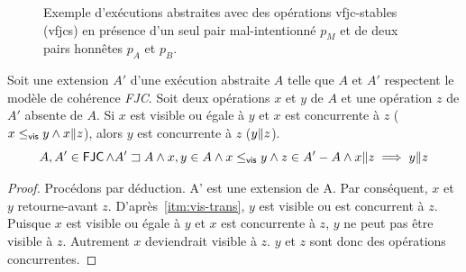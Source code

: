 \begin{figure}[htb]
\begin{subfigure}{\linewidth}
\caption{}\label{fig:vfjcs-one-malicious-3}
\end{subfigure}
\caption[Stabilité \acl{VFJC} en présence d'un pair mal-intentionné]{Exemple d'exécutions abstraites avec des opérations vfjc-stables (vfjcs) en présence d'un seul pair mal-intentionné $p_M$ et de deux pairs honnêtes $p_A$ et $p_B$.}\label{fig:vfjcs-one-malicious}
\end{figure}

\begin{proposition}\label{th:concur-triad}
Soit une extension $A'$ d'une exécution abstraite $A$ telle que $A$ et $A'$ respectent le modèle de cohérence \emph{FJC}.
Soit deux opérations $x$ et $y$ de $A$ et une opération $z$ de $A'$ absente de $A$.
Si $x$ est visible ou égale à $y$ et $x$ est concurrente à $z$ ($x \leq_{\operatorname{\mathsf{vis}}} y \land x \| z$), alors $y$ est concurrente à $z$ ($y \| z$).
\begin{equation*}
    A, A' \in \operatorname{\mathsf{FJC}} \land A' \sqsupset A \land x, y \in A \land x \leq_{\operatorname{\mathsf{vis}}} y \land z \in A'- A \land x \| z \implies y \| z
\end{equation*}
\end{proposition}

\begin{proof}
Procédons par déduction.
A' est une extension de A.
Par conséquent, $x$ et $y$ retourne-avant $z$.
D'après~\ref{itm:vis-trans}, $y$ est visible ou est concurrent à $z$.
Puisque $x$ est visible ou égale à $y$ et $x$ est concurrente à $z$, $y$ ne peut pas être visible à $z$.
Autrement $x$ deviendrait visible à $z$.
$y$ et $z$ sont donc des opérations concurrentes.
\end{proof}


